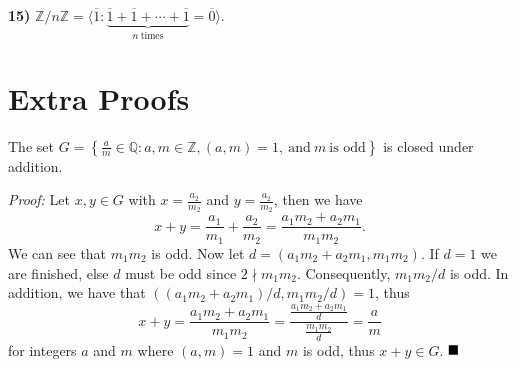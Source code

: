 \documentclass[12pt]{article}
\newcommand{\Z}{\mathbb{Z}}
\newcommand{\Q}{\mathbb{Q}}
\newcommand{\braceb}[1]{\left\{#1\right\}}
\newcommand{\parenb}[1]{\left(#1\right)}
\newcommand{\done}{\ensuremath{\strut\hfill\blacksquare}}
\begin{document}
\textbf{15)}
\(
	\Z / n\Z
	= \langle \overline{1} : \underbrace{
	\overline{1} + \overline{1} + \cdots + \overline{1}
	}_{n \ \text{times}} = \overline{0} \rangle.
\)

\section*{Extra Proofs}

\label{proof1}
The set
\(
	G = \braceb{
		\frac{a}{m} \in \Q : a, m \in \Z, (a, m) = 1,
		\ \text{and} \
		m
		\ \text{is odd}
	}
\)
is closed under addition.

\textit{Proof:}
Let \( x, y \in G \) with \( x = \frac{a_2}{m_2} \) and
\( y = \frac{a_2}{m_2} \), then we have
\[
	x + y
	= \frac{a_1}{m_1} + \frac{a_2}{m_2} = \frac{a_1m_2 + a_2m_1}{m_1m_2}.
\]
We can see that \( m_1m_2 \) is odd.
Now let \( d = (a_1m_2 + a_2m_1, m_1m_2) \).
If \( d = 1 \) we are finished, else \( d \) must be odd since
\( 2 \nmid m_1m_2 \).
Consequently, \( m_1m_2 / d \) is odd.
In addition, we have that \( \parenb{(a_1m_2 + a_2m_1) / d, m_1m_2 / d} = 1 \),
thus
\[
	x + y
	= \frac{a_1m_2 + a_2m_1}{m_1m_2}
	= \frac{\frac{a_1m_2 + a_2m_1}{d}}{\frac{m_1m_2}{d}}
	= \frac{a}{m}
\]
for integers \( a \) and \( m \) where \( (a, m) = 1 \) and \( m \) is odd,
thus \( x + y \in G \).
\done
\end{document}
